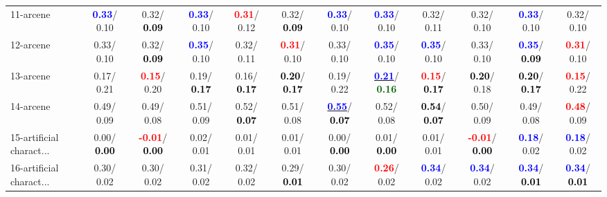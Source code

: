 \begin{table}[h]
\begin{center}
{\begin{tabular}{lc|c|c|c|c|c|c|c|c|c|c}
11-arcene & \textcolor{blue}{\textbf{  0.33}}/  0.10 &   0.32/\textcolor{black}{\textbf{  0.09}} & \textcolor{blue}{\textbf{  0.33}}/  0.10 & \textcolor{red}{\textbf{  0.31}}/  0.12 &   0.32/\textcolor{black}{\textbf{  0.09}} & \textcolor{blue}{\textbf{  0.33}}/  0.10 & \textcolor{blue}{\textbf{  0.33}}/  0.10 &   0.32/  0.11 &   0.32/  0.10 & \textcolor{blue}{\textbf{  0.33}}/  0.10 &   0.32/  0.10 \\
12-arcene &   0.33/  0.10 &   0.32/\textcolor{black}{\textbf{  0.09}} & \textcolor{blue}{\textbf{  0.35}}/  0.10 &   0.32/  0.11 & \textcolor{red}{\textbf{  0.31}}/  0.10 &   0.33/  0.10 & \textcolor{blue}{\textbf{  0.35}}/  0.10 & \textcolor{blue}{\textbf{  0.35}}/  0.10 &   0.33/  0.10 & \textcolor{blue}{\textbf{  0.35}}/\textcolor{black}{\textbf{  0.09}} & \textcolor{red}{\textbf{  0.31}}/  0.10 \\
13-arcene &   0.17/  0.21 & \textcolor{red}{\textbf{  0.15}}/  0.20 &   0.19/\textcolor{black}{\textbf{  0.17}} &   0.16/\textcolor{black}{\textbf{  0.17}} & \textcolor{black}{\textbf{  0.20}}/\textcolor{black}{\textbf{  0.17}} &   0.19/  0.22 & \underline{\textcolor{blue}{\textbf{  0.21}}}/\textcolor{darkgreen}{\textbf{  0.16}} & \textcolor{red}{\textbf{  0.15}}/\textcolor{black}{\textbf{  0.17}} & \textcolor{black}{\textbf{  0.20}}/  0.18 & \textcolor{black}{\textbf{  0.20}}/\textcolor{black}{\textbf{  0.17}} & \textcolor{red}{\textbf{  0.15}}/  0.22 \\
14-arcene &   0.49/  0.09 &   0.49/  0.08 &   0.51/  0.09 &   0.52/\textcolor{black}{\textbf{  0.07}} &   0.51/  0.08 & \underline{\textcolor{blue}{\textbf{  0.55}}}/\textcolor{black}{\textbf{  0.07}} &   0.52/  0.08 & \textcolor{black}{\textbf{  0.54}}/\textcolor{black}{\textbf{  0.07}} &   0.50/  0.09 &   0.49/  0.08 & \textcolor{red}{\textbf{  0.48}}/  0.09 \\ \hline
15-artificial charact... &   0.00/\textcolor{black}{\textbf{  0.00}} & \textcolor{red}{\textbf{ -0.01}}/\textcolor{black}{\textbf{  0.00}} &   0.02/  0.01 &   0.01/  0.01 &   0.01/  0.01 &   0.00/\textcolor{black}{\textbf{  0.00}} &   0.01/\textcolor{black}{\textbf{  0.00}} &   0.01/  0.01 & \textcolor{red}{\textbf{ -0.01}}/\textcolor{black}{\textbf{  0.00}} & \textcolor{blue}{\textbf{  0.18}}/  0.02 & \textcolor{blue}{\textbf{  0.18}}/  0.02 \\
16-artificial charact... &   0.30/  0.02 &   0.30/  0.02 &   0.31/  0.02 &   0.32/  0.02 &   0.29/\textcolor{black}{\textbf{  0.01}} &   0.30/  0.02 & \textcolor{red}{\textbf{  0.26}}/  0.02 & \textcolor{blue}{\textbf{  0.34}}/  0.02 & \textcolor{blue}{\textbf{  0.34}}/  0.02 & \textcolor{blue}{\textbf{  0.34}}/\textcolor{black}{\textbf{  0.01}} & \textcolor{blue}{\textbf{  0.34}}/\textcolor{black}{\textbf{  0.01}} \\

\end{tabular}}
\end{center}
\end{table}
